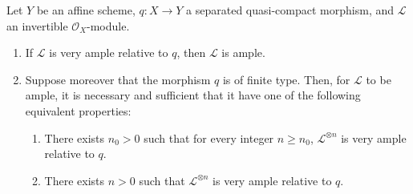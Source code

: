 \begin{proposition}[4.5.10]
\label{II.4.5.10}
Let $Y$ be an affine scheme, $q:X\to Y$ a separated quasi-compact morphism,
and $\mathcal{L}$ an invertible $\mathcal{O}_X$-module.
\begin{enumerate}
  \item[\rm{(i)}] If $\mathcal{L}$ is very ample relative to $q$, then
  $\mathcal{L}$ is ample.
  \item[\rm{(ii)}] Suppose moreover that the morphism $q$ is of finite type.
  Then, for $\mathcal{L}$ to be ample, it is necessary and sufficient that it have
  one of the following equivalent properties:
  \begin{enumerate}
    \item[\rm{e)}] There exists $n_0>0$ such that for every integer $n\geq n_0$,
    $\mathcal{L}^{\otimes n}$ is very ample relative to $q$.
    \item[\rm{e')}] There exists $n>0$ such that $\mathcal{L}^{\otimes n}$ is
    very ample relative to $q$.
  \end{enumerate}
\end{enumerate}
\end{proposition}

